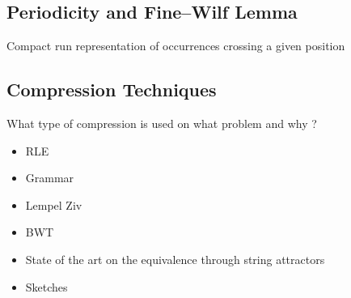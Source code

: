 \subsection{Periodicity and Fine--Wilf Lemma}\label{sec:prelim:FW}
Compact run representation of occurrences crossing a given position


\subsection{Compression Techniques}\label{sec:prelim:compress}
What type of compression is used on what problem and why ?
\begin{itemize}
\item RLE
\item Grammar
\item Lempel Ziv
\item BWT
\item State of the art on the equivalence through string attractors
\item Sketches
\end{itemize}